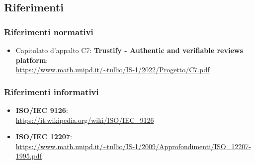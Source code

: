 \subsection{Riferimenti}
\subsubsection{Riferimenti normativi}
\begin{itemize}
    \item Capitolato d'appalto C7: \textbf{Trustify - Authentic and verifiable reviews platform}: \\
          \url{https://www.math.unipd.it/~tullio/IS-1/2022/Progetto/C7.pdf}
\end{itemize}
\subsubsection{Riferimenti informativi}
\begin{itemize}
       \item \textbf{ISO/IEC 9126}: \\
          \url{https://it.wikipedia.org/wiki/ISO/IEC_9126}
      \item \textbf{ISO/IEC 12207}: \\
          \url{https://www.math.unipd.it/~tullio/IS-1/2009/Approfondimenti/ISO_12207-1995.pdf}
\end{itemize}